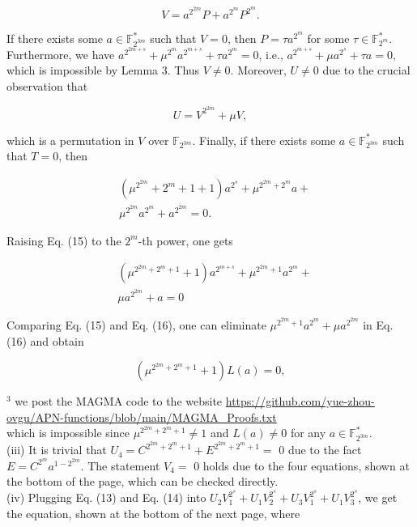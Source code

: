 \documentclass[10pt]{article}
\begin{document}
$$
V=a^{2^{2 m}} P+a^{2^{m}} P^{2^{m}} .
$$

If there exists some $a \in \mathbb{F}_{2^{3 m}}^{*}$ such that $V=0$, then $P= \tau a^{2^{m}}$ for some $\tau \in \mathbb{F}_{2^{m}}^{*}$. Furthermore, we have $a^{2^{2 m+s}}+ \mu^{2^{m}} a^{2^{m+s}}+\tau a^{2^{m}}=0$, i.e., $a^{2^{m+s}}+\mu a^{2^{s}}+\tau a=0$, which is impossible by Lemma 3. Thus $V \neq 0$. Moreover, $U \neq 0$ due to the crucial observation that

$$
U=V^{2^{2 m}}+\mu V,
$$

which is a permutation in $V$ over $\mathbb{F}_{2^{3 m}}$. Finally, if there exists some $a \in \mathbb{F}_{2^{3 m}}^{*}$ such that $T=0$, then


\begin{align*}
& \left(\mu^{2^{2 m}}+2^{m}+1+1\right) a^{2^{s}}+\mu^{2^{2 m}+2^{m}} a+ \\
& \mu^{2^{2 m}} a^{2^{m}}+a^{2^{2 m}}=0 . \tag{15}
\end{align*}


Raising Eq. (15) to the $2^{m}$-th power, one gets


\begin{align*}
& \left(\mu^{2^{2 m}+2^{m}+1}+1\right) a^{2^{m+s}}+\mu^{2^{2 m}+1} a^{2^{m}}+ \\
& \mu a^{2^{2 m}}+a=0 \tag{16}
\end{align*}


Comparing Eq. (15) and Eq. (16), one can eliminate $\mu^{2^{2 m}+1} a^{2^{m}}+\mu a^{2^{2 m}}$ in Eq. (16) and obtain

$$
\left(\mu^{2^{2 m}+2^{m}+1}+1\right) L(a)=0,
$$

${ }^{3}$ we post the MAGMA code to the website \href{https://github.com/yue-zhou-ovgu/APN-functions/blob/main/MAGMA_Proofs.txt}{https://github.com/yue-zhou-ovgu/APN-functions/blob/main/MAGMA\_Proofs.txt}\\
which is impossible since $\mu^{2^{2 m}+2^{m}+1} \neq 1$ and $L(a) \neq 0$ for any $a \in \mathbb{F}_{2^{3 m}}^{*}$.\\
(iii) It is trivial that $U_{4}=C^{2^{2 m}+2^{m}+1}+E^{2^{2 m}+2^{m}+1}=$ 0 due to the fact $E=C^{2^{m}} a^{1-2^{2 m}}$. The statement $V_{4}=$ 0 holds due to the four equations, shown at the bottom of the page, which can be checked directly.\\
(iv) Plugging Eq. (13) and Eq. (14) into $U_{2} V_{1}^{2^{s}}+U_{1} V_{2}^{2^{s}}+ U_{3} V_{1}^{2^{s}}+U_{1} V_{3}^{2^{s}}$, we get the equation, shown at the bottom of the next page, where
\end{document}
